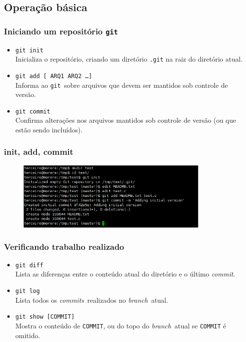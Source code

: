 \documentclass{beamer}
\newcommand{\git}{\texttt{git}}
\newcommand{\branch}{\emph{branch}}
\newcommand{\commit}{\emph{commit}}
\newcommand{\commits}{\emph{commits}}
\begin{document}
\subsection{Operação básica}

\begin{frame}
  \frametitle{Iniciando um repositório \git}
  \begin{itemize}
    \item \texttt{git init}\\
      Inicializa o repositório, criando um diretório \texttt{.git} na
      raiz do diretório atual.
      \pause

    \item \texttt{git add [ ARQ1 ARQ2 \ldots ]}\\
      Informa ao \git\ sobre arquivos que devem ser mantidos sob controle
      de versão.
      \pause

    \item \texttt{git commit}\\
      Confirma alterações nos arquivos mantidos sob controle de versão
      (ou que estão sendo incluídos).
  \end{itemize}
\end{frame}

\begin{frame}
  \frametitle{init, add, commit}
  \begin{figure}[h]
    \begin{center}
      \includegraphics[width=0.85\textwidth]{figs/git-screenshot-init-add-commit.eps}
    \end{center}
    \label{fig:git-init-add-commit}
  \end{figure}
\end{frame}

\begin{frame}
  \frametitle{Verificando trabalho realizado}
  \begin{itemize}

    \item \texttt{git diff}\\
      Lista as diferenças entre o conteúdo atual do diretório e o último
      \commit.
      \pause

    \item \texttt{git log}\\
      Lista todos os \commits\ realizados no \branch\ atual.
      \pause

    \item \texttt{git show [COMMIT]}\\
      Mostra o conteúdo de \texttt{COMMIT}, ou do topo do \branch\ atual
      se \texttt{COMMIT} é omitido.

  \end{itemize}
\end{frame}
\end{document}
